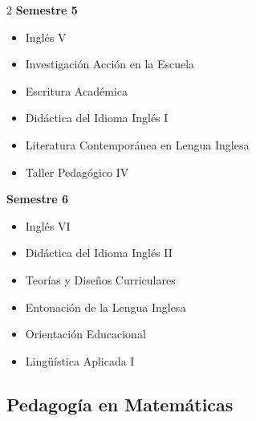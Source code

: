 \documentclass[12pt,a4paper]{article}
\begin{document}
\begin{multicols}{2}
		\textbf{Semestre 5}
		\begin{itemize}
			\item Inglés V
			\item Investigación Acción en la Escuela
			\item Escritura Académica
			\item Didáctica del Idioma Inglés I
			\item Literatura Contemporánea en Lengua Inglesa
			\item Taller Pedagógico IV
		\end{itemize}
		
		\textbf{Semestre 6}
		\begin{itemize}
			\item Inglés VI
			\item Didáctica del Idioma Inglés II
			\item Teorías y Diseños Curriculares
			\item Entonación de la Lengua Inglesa
			\item Orientación Educacional
			\item Lingüística Aplicada I
		\end{itemize}
	\end{multicols}
	
	\newpage
	
	\subsection{Pedagogía en Matemáticas}
	
\end{document}
